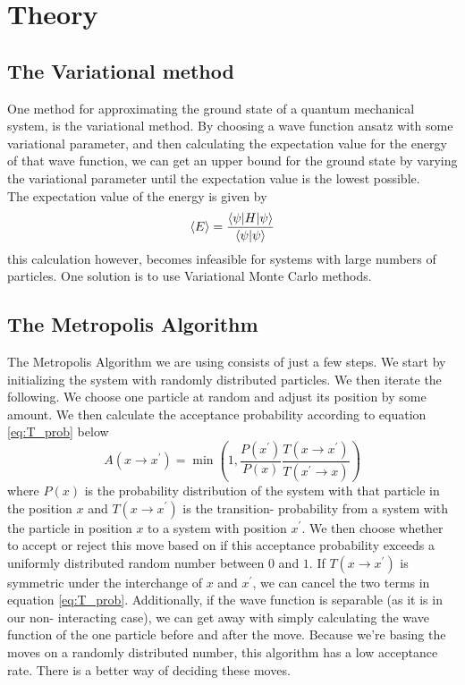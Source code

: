 \documentclass[11pt,a4paper,titlepage]{article}
\begin{document}
\section{Theory}
\subsection{The Variational method}
One method for approximating the ground state of a quantum mechanical system, is the variational method. By choosing a wave function ansatz with some variational parameter, and then calculating the expectation value for the energy of that wave function, we can get an upper bound for the ground state by varying the variational parameter until the expectation value is the lowest possible.\\The expectation value of the energy is given by
\begin{equation}
\braket{E} = \frac{\braket{\psi | H | \psi	}}{\braket{\psi|\psi}}
\end{equation}
this calculation however, becomes infeasible for systems with large numbers of particles. One solution is to use Variational Monte Carlo methods.
\subsection{The Metropolis Algorithm}
The Metropolis Algorithm we are using consists of just a few steps. We start by initializing the system with randomly distributed particles. We then iterate the following. We choose one particle at random and adjust its position by some amount. We then calculate the acceptance probability according to equation \eqref{eq:T_prob} below
\begin{equation}
A\left(x\rightarrow x^{\prime}\right)=\min \left(1, \frac{P\left(x^{\prime}\right)}{P\left(x\right)} \frac{T\left(x\rightarrow x^{\prime}\right)}{T\left(x^{\prime}\rightarrow x\right)}\right)\label{eq:T_prob}
\end{equation}
where $P(x)$ is the probability distribution of the system with that particle in the position $x$ and $T\left(x\rightarrow x^{\prime}\right)$ is the transition- probability from a system with the particle in position $x$ to a system with position $x^{\prime}$.
We then choose whether to accept or reject this move based on if this acceptance probability exceeds a uniformly distributed random number between $0$ and $1$. If $T\left(x\rightarrow x^{\prime}\right)$ is symmetric under the interchange of $x$ and $x^{\prime}$, we can cancel the two terms in equation \eqref{eq:T_prob}. Additionally, if the wave function is separable (as it is in our non- interacting case), we can get away with simply calculating the wave function of the one particle before and after the move. Because we're basing the moves on a randomly distributed number, this algorithm has a low acceptance rate. There is a better way of deciding these moves.
\end{document}
